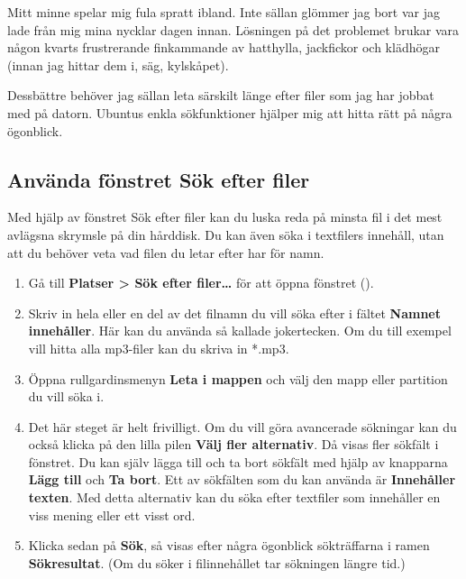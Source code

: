 \documentclass[a4paper,final]{memoir} %
\begin{document}

Mitt minne spelar mig fula spratt ibland. Inte sällan glömmer jag bort var jag lade från mig mina nycklar dagen innan. Lösningen på det problemet brukar vara någon kvarts frustrerande finkammande av hatthylla, jackfickor och klädhögar (innan jag hittar dem i, säg, kylskåpet). 

Dessbättre behöver jag sällan leta särskilt länge efter filer som jag har jobbat med på datorn. Ubuntus enkla sökfunktioner hjälper mig att hitta rätt på några ögonblick. 

\subsection{Använda fönstret Sök efter filer}

Med hjälp av fönstret Sök efter filer kan du luska reda på minsta fil i det mest avlägsna skrymsle på din hårddisk. Du kan även söka i textfilers innehåll, utan att du behöver veta vad filen du letar efter har för namn.


\begin{enumerate}

\item Gå till \textbf{Platser \textgreater{} Sök efter filer\ldots{}} för att öppna fönstret ().
\item Skriv in hela eller en del av det filnamn du vill söka efter i fältet \textbf{Namnet innehåller}. Här kan du använda så kallade jokertecken. Om du till exempel vill hitta alla mp3-filer kan du skriva in *.mp3.
\item Öppna rullgardinsmenyn \textbf{Leta i mappen} och välj den mapp eller partition du vill söka i. 
\item Det här steget är helt frivilligt. Om du vill göra avancerade sökningar kan du också klicka på den lilla pilen \textbf{Välj fler alternativ}. Då visas fler sökfält i fönstret. Du kan själv lägga till och ta bort sökfält med hjälp av knapparna \textbf{Lägg till} och \textbf{Ta bort}. Ett av sökfälten som du kan använda är \textbf{Innehåller texten}. Med detta alternativ kan du söka efter textfiler som innehåller en viss mening eller ett visst ord. 
\item Klicka sedan på \textbf{Sök}, så visas efter några ögonblick sökträffarna i ramen \textbf{Sökresultat}. (Om du söker i filinnehållet tar sökningen längre tid.)

\end{enumerate}
\end{document}
